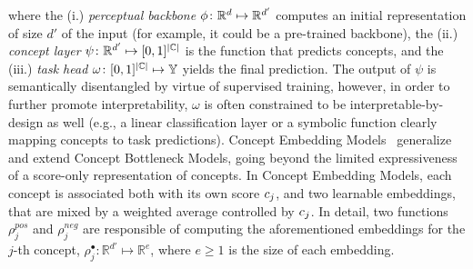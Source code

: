 where the (i.) \textit{perceptual backbone} $\phi \colon \mathbb{R}^{d} \mapsto \mathbb{R}^{d'}$ computes an initial representation of size $d'$ of the input (for example, it could be a pre-trained backbone), the (ii.) \textit{concept layer} $\psi \colon \mathbb{R}^{d'} \mapsto [0,1]^{|{\mathbb{C}}|}$ is the function that predicts concepts, and the (iii.) \textit{task head} $\omega \colon [0,1]^{|{\mathbb{C}}|} \mapsto {\mathbb{Y}}$ yields the final prediction. 
The output of $\psi$ is semantically disentangled by virtue of supervised training, however, in order to further promote interpretability, $\omega$ is often constrained to be interpretable-by-design as well (e.g., a linear classification layer or a symbolic function clearly mapping concepts to task predictions).
%
%
%
%
%
Concept Embedding Models~\cite{espinosa2022concept} generalize and extend Concept Bottleneck Models, going beyond the limited expressiveness of a score-only representation of concepts.
In Concept Embedding Models, each concept is associated both with its own score ${c}_j$, and two learnable embeddings, that are mixed by a weighted average controlled by ${c}_j$. In detail, two functions $\rho^{pos}_j$ and $\rho^{neg}_j$ are responsible of computing the aforementioned embeddings for the $j$-th concept, $\rho^{\bullet}_j \colon \mathbb{R}^{d'} \mapsto \mathbb{R}^{e}$, where $e \geq 1$ is the size of each embedding. 

